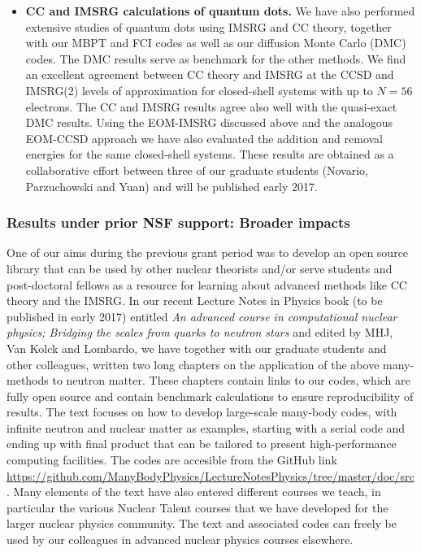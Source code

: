 \begin{itemize}
\item {\bf CC and IMSRG calculations of quantum dots.} We have also
  performed extensive studies of quantum dots using IMSRG and CC
  theory, together with our MBPT and FCI codes as well as our
  diffusion Monte Carlo (DMC) codes. The DMC results serve as
  benchmark for the other methods. We find an excellent agreement
  between CC theory and IMSRG at the CCSD and IMSRG(2) levels of approximation
  for closed-shell systems with up to $N=56$ electrons. The CC
  and IMSRG results agree also well with the quasi-exact DMC results.
  Using the EOM-IMSRG discussed above and the analogous EOM-CCSD
  approach we have also evaluated the addition and removal energies
  for the same closed-shell systems. These results are
  obtained as a collaborative effort between three of our graduate
  students (Novario, Parzuchowski and Yuan) and will be published early 2017.
\end{itemize}

\subsubsection{Results under prior NSF support: Broader impacts }

One of our aims during the previous grant period was to develop an
open source library that can be used by other nuclear theorists and/or
serve students and post-doctoral fellows as a resource for learning
about advanced methods like CC theory and the IMSRG.  In our recent
Lecture Notes in Physics book (to be published in early 2017)
entitled {\em An advanced course in computational nuclear physics;
Bridging the scales from quarks to neutron stars} and edited by MHJ,
Van Kolck and Lombardo, we have together with our graduate students
and other colleagues, written two long chapters on the application of
the above many-methods to neutron matter. These chapters contain
links to our codes, which are fully open source and contain
benchmark calculations to ensure reproducibility of results. The text focuses on how to
develop large-scale many-body codes, with infinite neutron and nuclear
matter as examples, starting with a serial code and ending up with final product that can be tailored to present high-performance computing
facilities. The codes are accesible from the GitHub
link \url{https://github.com/ManyBodyPhysics/LectureNotesPhysics/tree/master/doc/src}. Many elements of the text have also entered
different courses we teach, in particular the various Nuclear Talent
courses that we have developed for the larger nuclear physics community. The text and associated codes can freely be used by our
colleagues in advanced nuclear physics courses elsewhere. 












